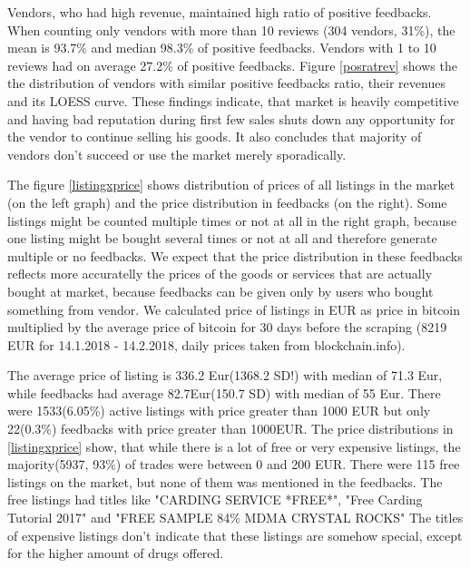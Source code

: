 \documentclass[
  digital, %
  table,   %
  lof,     %
  lot,     %
  oneside
]{fithesis3}
\begin{document}
Vendors, who had high revenue, maintained high ratio of positive feedbacks.
When counting only vendors with more than 10 reviews (304 vendors, 31\%),
the mean is 93.7\% and median 98.3\% of positive feedbacks.
Vendors with 1 to 10 reviews had on average 27.2\% of positive feedbacks.
Figure \ref{posratrev} shows the the distribution of vendors with similar
positive feedbacks ratio, their revenues and its LOESS curve.
These findings indicate, that market is heavily competitive and
having bad reputation during first few sales shuts down any opportunity
for the vendor to continue selling his goods. It also concludes that majority of vendors don't succeed or use
the market merely sporadically.

The figure \ref{listingxprice} shows distribution of prices of all listings in
 the market (on the left graph) and the price distribution in feedbacks (on the right).
 Some listings might be counted multiple times or not at all
 in the right graph, because one listing might be bought several times or not at all
 and therefore generate multiple or no feedbacks. We expect that the price distribution
 in these feedbacks reflects more accuratelly the prices of the goods or services
 that are actually bought at market, because feedbacks can be given only by users who
 bought something from vendor. We calculated price of listings in EUR as 
 price in bitcoin multiplied by the average price of bitcoin for 30 days before the scraping
 (8219 EUR for 14.1.2018 - 14.2.2018, daily prices taken from blockchain.info).
 
 The average price of listing is 336.2 Eur(1368.2 SD!) with median of 71.3 Eur,
 while feedbacks had average 82.7Eur(150.7 SD) with median of 55 Eur.
  There were 1533(6.05\%) active listings with price greater than 1000 EUR but 
  only 22(0.3\%) feedbacks with price greater than 1000EUR.
 The price distributions in \ref{listingxprice} show,
 that while there is a lot of free or very expensive listings,
 the majority(5937, 93\%) of trades were between 0 and 200 EUR.
 There were 115 free listings on the market,
 but none of them was mentioned in the feedbacks.
 The free listings had titles like "CARDING SERVICE *FREE*",
  "Free Carding Tutorial 2017" and "FREE SAMPLE 84\% MDMA CRYSTAL ROCKS"
 The titles of expensive listings don't indicate that 
these listings are somehow special, except for the higher amount of drugs offered.
\end{document}

